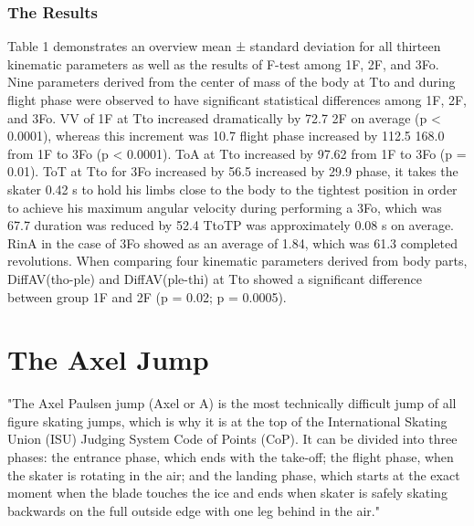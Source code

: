 \documentclass[12pt,journal,compsoc]{IEEEtran}
\begin{document}
\subsubsection{The Results}
Table 1 demonstrates an overview mean ± standard deviation for all thirteen kinematic
parameters as well as the results of F-test among 1F, 2F, and 3Fo. Nine parameters derived from the
center of mass of the body at Tto and during flight phase were observed to have significant statistical
differences among 1F, 2F, and 3Fo. VV of 1F at Tto increased dramatically by 72.7%
2F on average (p < 0.0001), whereas this increment was 10.7%
flight phase increased by 112.5%
168.0%
from 1F to 3Fo (p < 0.0001). ToA at Tto increased by 97.62%
from 1F to 3Fo (p = 0.01). ToT at Tto for 3Fo increased by 56.5%
increased by 29.9%
phase, it takes the skater 0.42 s to hold his limbs close to the body to the tightest position in order to
achieve his maximum angular velocity during performing a 3Fo, which was 67.7%
duration was reduced by 52.4%
TtoTP was approximately 0.08 s on average. RinA in the case of 3Fo showed as an average of 1.84,
which was 61.3%
completed revolutions. When comparing four kinematic parameters derived from body parts,
DiffAV(tho-ple) and DiffAV(ple-thi) at Tto showed a significant difference between group 1F and 2F
(p = 0.02; p = 0.0005). 


\section{The Axel Jump}
"The Axel Paulsen jump (Axel or A) is the most technically
difficult jump of all figure skating jumps, which is why it is at the
top of the International Skating Union (ISU) Judging System
Code of Points (CoP). It can be divided into three phases: the
entrance phase, which ends with the take-off; the flight phase,
when the skater is rotating in the air; and the landing phase,
which starts at the exact moment when the blade touches the
ice and ends when skater is safely skating backwards on the full
outside edge with one leg behind in the air." \cite{Axel}
\end{document}
